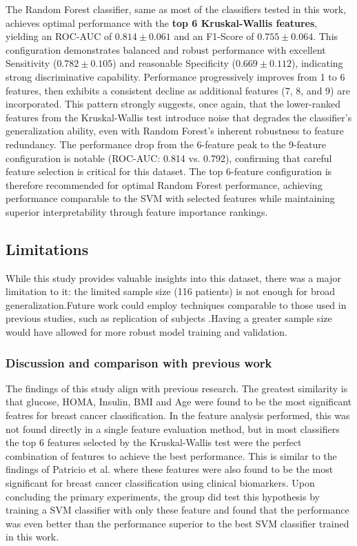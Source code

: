 \documentclass[12pt,a4paper]{article}
\begin{document}
The Random Forest classifier, same as most of the classifiers tested in this work, achieves optimal performance with the \textbf{top 6 Kruskal-Wallis features}, yielding an ROC-AUC of $0.814 \pm 0.061$ and an F1-Score of $0.755 \pm 0.064$. This configuration demonstrates balanced and robust performance with excellent Sensitivity ($0.782 \pm 0.105$) and reasonable Specificity ($0.669 \pm 0.112$), indicating strong discriminative capability. Performance progressively improves from 1 to 6 features, then exhibits a consistent decline as additional features (7, 8, and 9) are incorporated. This pattern strongly suggests, once again, that the lower-ranked features from the Kruskal-Wallis test introduce noise that degrades the classifier's generalization ability, even with Random Forest's inherent robustness to feature redundancy. The performance drop from the 6-feature peak to the 9-feature configuration is notable (ROC-AUC: 0.814 vs. 0.792), confirming that careful feature selection is critical for this dataset. The top 6-feature configuration is therefore recommended for optimal Random Forest performance, achieving performance comparable to the SVM with selected features while maintaining superior interpretability through feature importance rankings.

\subsection{Limitations}
While this study provides valuable insights into this dataset, there was a major limitation to it: the limited sample size (116 patients) is not enough for broad generalization.Future work could employ techniques comparable to those used in previous studies, such as replication of subjects \cite{patricio2018using}.Having a greater sample size would have allowed for more robust model training and validation.

\subsubsection{Discussion and comparison with previous work}
The findings of this study align with previous research. The greatest similarity is that glucose, HOMA, Insulin, BMI and Age were found to be the most significant featres for breast cancer classification. In the feature analysis performed, this was not found directly in a single feature evaluation method, but in most classifiers the top 6 features selected by the Kruskal-Wallis test were the perfect combination of features to achieve the best performance. This is similar to the findings of Patricio et al. \cite{patricio2018using} where these features were also found to be the most significant for breast cancer classification using clinical biomarkers. Upon concluding the primary experiments, the group did test this hypothesis by training a SVM classifier with only these feature and found that the performance was even better than the performance superior to the best SVM classifier trained in this work.
\end{document}
